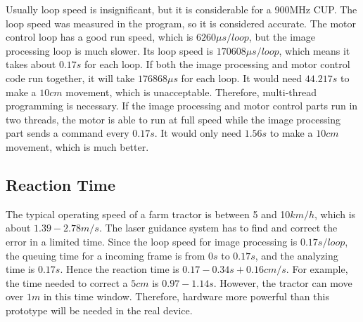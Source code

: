 \documentclass[letterpaper,12pt,oneside]{book}
\begin{document}
		Usually loop speed is insignificant, but it is considerable for a 900MHz CUP. The loop speed was measured in the program, so it is considered accurate. The motor control loop has a good run speed, which is $6260\mu s/loop$, but the image processing loop is much slower. Its loop speed is $170608\mu s/loop$, which means it takes about $0.17s$ for each loop. If both the image processing and motor control code run together, it will take $176868\mu s$ for each loop. It would need $44.217s$ to make a $10cm$ movement, which is unacceptable. Therefore, multi-thread programming is necessary. If the image processing and motor control parts run in two threads, the motor is able to run at full speed while the image processing part sends a command every $0.17s$. It would only need $1.56s$ to make a $10cm$ movement, which is much better.
		
		
		\subsection{Reaction Time}
		
		The typical operating speed of a farm tractor is between 5 and 10$km/h$, which is about $1.39-2.78m/s$. The laser guidance system has to find and correct the error in a limited time. Since the loop speed for image processing is $0.17s/loop$, the queuing time for a incoming frame is from $0s$ to $0.17s$, and the analyzing time is $0.17s$. Hence the reaction time is $0.17-0.34s + 0.16cm/s$. For example, the time needed to correct a $5cm$ is $0.97-1.14s$. However, the tractor can move over $1m$ in this time window. Therefore, hardware more powerful than this prototype will be needed in the real device.
		
		
		
		
\end{document}
